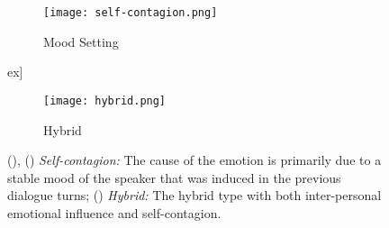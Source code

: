 \documentclass[smallextended]{svjour3}
\newcommand\0{\hphantom{0}}
\begin{document}
\begin{figure*}[t]
     \centering
     \begin{subfigure}[b]{60ex}
         \centering
         \texttt{[image: self-contagion.png]}
         \caption{Mood Setting}
         \label{fig:self-contagion}
     \end{subfigure}
\3ex]
     \begin{subfigure}[b]{60ex}
         \centering
         \texttt{[image: hybrid.png]}
         \caption{Hybrid}
         \label{fig:hybrid}
     \end{subfigure}
     \caption{{(), () \textit{Self-contagion:} The cause of the emotion is primarily due to a stable mood of the speaker that was induced in the previous dialogue turns; () \textit{Hybrid:} The hybrid type 
with both
     inter-personal emotional influence and self-contagion.
}}
\end{figure*}
\end{document}
